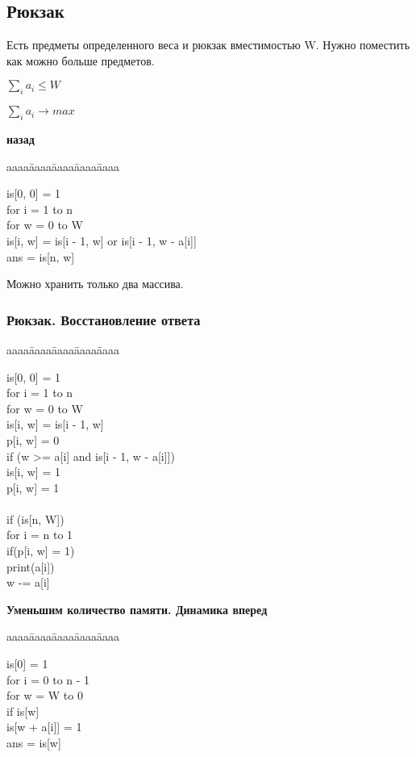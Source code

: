 \documentclass[12pt]{article}
\def\t{\texttt}
\newenvironment{MyTabbing}{
\t\bgroup
\begin{tabbing}
aaaa\=aaaa\=aaaa\=aaaa\=aaaa\kill
}{
\end{tabbing}
\t\egroup
}
\begin{document}
\subsection{Рюкзак}
Есть предметы определенного веса и рюкзак вместимостью W. Нужно поместить как можно больше предметов.

$\sum_{i}a_i \le W$

$\sum_{i}a_i \to max$

{\bf назад}
\begin{MyTabbing}
is[0, 0] = 1\\
for i = 1 to n\\
\>for w = 0 to W\\
\>\>is[i, w] = is[i - 1, w] or is[i - 1, w - a[i]]\\
ans = is[n, w]\\
\end{MyTabbing}

Можно хранить только два массива. 

\subsubsection{Рюкзак. Восстановление ответа}

\begin{MyTabbing}
is[0, 0] =  1\\
for i = 1 to n\\
\>for w = 0 to W\\
\>\>is[i, w] = is[i - 1, w]\\
\>\>p[i, w] = 0\\
\>\>if (w >= a[i] and is[i - 1, w - a[i]])\\
\>\>\>is[i, w] = 1\\
\>\>\>p[i, w] = 1\\
\\
if (is[n, W])\\
\>for i = n to 1\\
\>\>if(p[i, w] = 1)\\
\>\>\>print(a[i])\\
\>\>\>w -= a[i]\\
\end{MyTabbing}

{\bf Уменьшим количество памяти. Динамика вперед}

\begin{MyTabbing}
is[0] = 1\\
for i = 0 to n - 1\\
\>for w = W to 0\\
\>\>if is[w]\\
\>\>\>is[w + a[i]] = 1\\
ans = is[w]\\
\end{MyTabbing}
\end{document}
